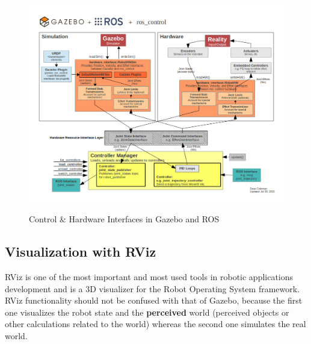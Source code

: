 \begin{center}
\begin{figure}[H]
\centering
\includegraphics[width=12cm]{images/Gazebo_ros_transmission.png}\\
\caption{Control \& Hardware Interfaces in Gazebo and ROS}
\end{figure}
\end{center}


\subsection{Visualization with RViz}

RViz is one of the most important and most used tools in robotic applications development and is a 3D visualizer for the Robot Operating System framework. RViz functionality should not be confused 
with that of Gazebo, because the first one visualizes the robot state and the \textbf{perceived} world (perceived objects or other calculations related to the world) whereas the second one simulates the real world.


